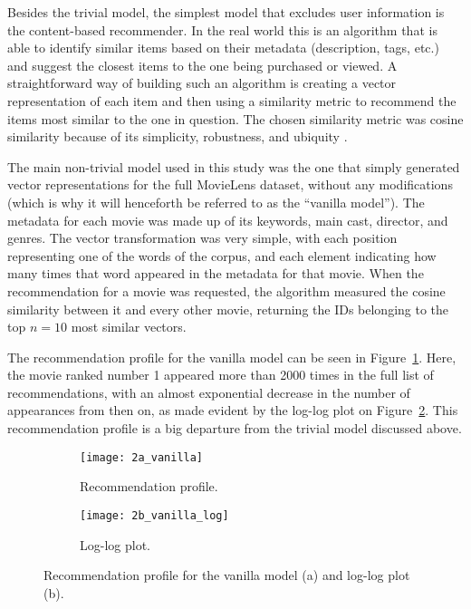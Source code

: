 Besides the trivial model, the simplest model that excludes user information is
the content-based recommender. In the real world this is an algorithm that is
able to identify similar items based on their metadata (description, tags, etc.)
and suggest the closest items to the one being purchased or viewed. A
straightforward way of building such an algorithm is creating a vector
representation of each item and then using a similarity metric to recommend the
items most similar to the one in question. The chosen similarity metric was
cosine similarity because of its simplicity, robustness, and ubiquity
\citep{sarwar_item-based_2001}.

The main non-trivial model used in this study was the one that simply generated
vector representations for the full MovieLens dataset, without any modifications
(which is why it will henceforth be referred to as the ``vanilla model''). The
metadata for each movie was made up of its keywords, main cast, director, and
genres. The vector transformation was very simple, with each position
representing one of the words of the corpus, and each element indicating how
many times that word appeared in the metadata for that movie. When the
recommendation for a movie was requested, the algorithm measured the cosine
similarity between it and every other movie, returning the IDs belonging to
the top $n = 10$ most similar vectors.

The recommendation profile for the vanilla model can be seen in
Figure~\ref{fig:fig2a}. Here, the movie ranked number 1 appeared more than 2000
times in the full list of recommendations, with an almost exponential decrease
in the number of appearances from then on, as made evident by the log-log plot
on Figure~\ref{fig:fig2b}. This recommendation profile is a big departure from
the trivial model discussed above.

\begin{figure}
  \centering
  \begin{subfigure}{0.45\textwidth}
    \centering
    \texttt{[image: 2a\_vanilla]}
    \caption{Recommendation profile.\label{fig:fig2a}}
  \end{subfigure}
  \begin{subfigure}{0.45\textwidth}
    \centering
    \texttt{[image: 2b\_vanilla\_log]}
    \caption{Log-log plot.\label{fig:fig2b}}
  \end{subfigure}
  \caption{Recommendation profile for the vanilla model (a) and log-log plot
    (b).\label{fig:fig2}}
\end{figure}

